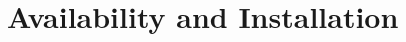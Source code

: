 
%
%
%
%
%
%
%
%
%
%
%
%
%
%
% 
% 
% 
% 
% 

\section{\NAMD\ Availability and Installation}
\label{section:avail}

